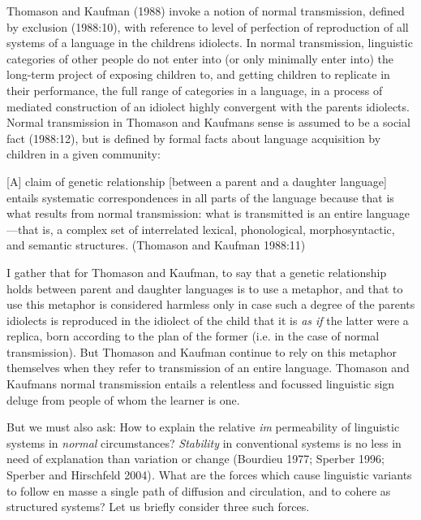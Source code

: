 Thomason and Kaufman (1988) invoke a notion of normal transmission, defined by exclusion (1988:10), with reference to level of perfection of reproduction of all systems of a language in the childrens idiolects. In normal transmission, linguistic categories of other people do not enter into (or only minimally enter into) the long-term project of exposing children to, and getting children to replicate in their performance, the full range of categories in a language, in a process of mediated construction of an idiolect highly convergent with the parents idiolects. 
Normal transmission in Thomason and Kaufmans sense is assumed to be a social fact (1988:12), but is defined by formal facts about language acquisition by children in a given community:

[A] claim of genetic relationship [between a parent and a daughter language] entails systematic correspondences in all parts of the language because that is what results from normal transmission: what is transmitted is an entire language---that is, a complex set of interrelated lexical, phonological, morphosyntactic, and semantic structures. (Thomason and Kaufman 1988:11)

	I gather that for Thomason and Kaufman, to say that a genetic relationship holds between parent and daughter languages is to use a metaphor, and that to use this metaphor is considered harmless only in case such a degree of the parents idiolects is reproduced in the idiolect of the child that it is \textit{as if} the latter were a replica, born according to the plan of the former (i.e. in the case of normal transmission). But Thomason and Kaufman continue to rely on this metaphor themselves when they refer to transmission of an entire language. Thomason and Kaufmans normal transmission entails a relentless and focussed linguistic sign deluge from people of whom the learner is one.



But we must also ask: How to explain the relative \textit{im}
permeability of linguistic systems in \textit{normal} circumstances? 
\textit{Stability }in conventional systems is no less in need of 
explanation than variation or change (Bourdieu 1977; Sperber 1996; 
Sperber and Hirschfeld 2004)\textit{. }What are the forces which 
cause linguistic variants to follow en masse a single path of diffusion 
and circulation, and to cohere as structured systems? Let us briefly 
consider three such forces.




